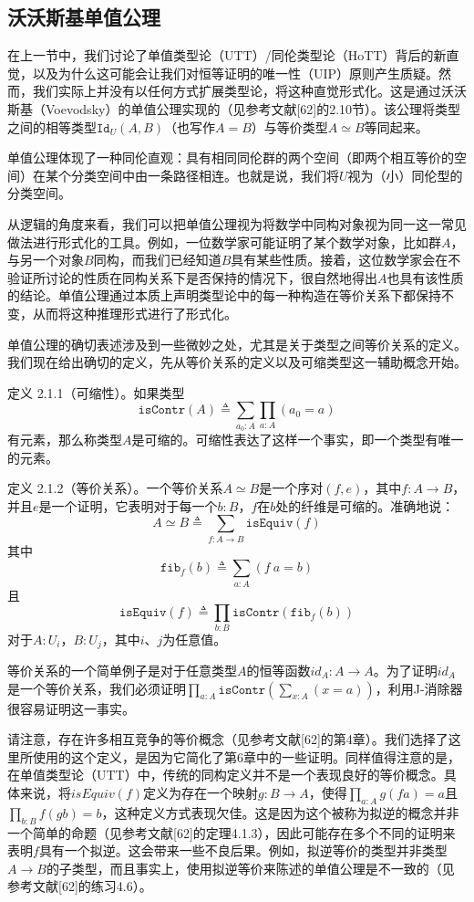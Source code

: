 \documentclass{ctexrep}
\theoremstyle{plain}
\theoremstyle{definition}
\theoremstyle{remark}
\newcommand{\fib}{\mathtt{fib}}
\begin{document}
\subsection{沃沃斯基单值公理}
在上一节中，我们讨论了单值类型论（UTT）/同伦类型论（HoTT）背后的新直觉，以及为什么这可能会让我们对恒等证明的唯一性（UIP）原则产生质疑。然而，我们实际上并没有以任何方式扩展类型论，将这种直觉形式化。这是通过沃沃斯基（Voevodsky）的单值公理实现的（见参考文献[62]的2.10节）。该公理将类型之间的相等类型\(\mathtt{Id}_{U}(A, B)\)（也写作\(A = B\)）与等价类型\(A \simeq B\)等同起来。

单值公理体现了一种同伦直观：具有相同同伦群的两个空间（即两个相互等价的空间）在某个分类空间中由一条路径相连。也就是说，我们将\(U\)视为（小）同伦型的分类空间。

从逻辑的角度来看，我们可以把单值公理视为将数学中同构对象视为同一这一常见做法进行形式化的工具。例如，一位数学家可能证明了某个数学对象，比如群\(A\)，与另一个对象\(B\)同构，而我们已经知道\(B\)具有某些性质。接着，这位数学家会在不验证所讨论的性质在同构关系下是否保持的情况下，很自然地得出\(A\)也具有该性质的结论。单值公理通过本质上声明类型论中的每一种构造在等价关系下都保持不变，从而将这种推理形式进行了形式化。 

单值公理的确切表述涉及到一些微妙之处，尤其是关于类型之间等价关系的定义。我们现在给出确切的定义，先从等价关系的定义以及可缩类型这一辅助概念开始。 

定义 2.1.1（可缩性）。如果类型
\[\mathtt{isContr} (A) \triangleq \sum_{a_{0}: A} \prod_{a: A}\left(a_{0}=a\right)\]
有元素，那么称类型\(A\)是可缩的。可缩性表达了这样一个事实，即一个类型有唯一的元素。 

定义 2.1.2（等价关系）。一个等价关系\(A \simeq B\)是一个序对\((f, e)\)，其中\(f: A \to B\)，并且\(e\)是一个证明，它表明对于每一个\(b: B\)，\(f\)在\(b\)处的纤维是可缩的。准确地说：
\[A \simeq B \triangleq \sum_{f: A \to B} \mathtt{isEquiv}(f)\]
其中
\[\fib_{f}(b) \triangleq \sum_{a: A}(f\ a = b)\] 且 \[\mathtt{isEquiv}(f) \triangleq \prod_{b: B} \mathtt{isContr}\left(\fib_{f}(b)\right)\]
对于\(A: U_{i}\)，\(B: U_{j}\)，其中\(i\)、\(j\)为任意值。 

等价关系的一个简单例子是对于任意类型\(A\)的恒等函数\(id_{A}: A \to A\)。为了证明\(id_{A}\)是一个等价关系，我们必须证明\(\prod_{a: A} \mathtt{isContr} (\sum_{x: A}(x = a))\)，利用J-消除器很容易证明这一事实。 

请注意，存在许多相互竞争的等价概念（见参考文献[62]的第4章）。我们选择了这里所使用的这个定义，是因为它简化了第6章中的一些证明。同样值得注意的是，在单值类型论（UTT）中，传统的同构定义并不是一个表现良好的等价概念。具体来说，将\(isEquiv(f)\)定义为存在一个映射\(g: B \to A\)，使得\(\prod_{a: A} g(f a)=a\)且\(\prod_{b: B} f(g b)=b\)，这种定义方式表现欠佳。这是因为这个被称为拟逆的概念并非一个简单的命题（见参考文献[62]的定理4.1.3），因此可能存在多个不同的证明来表明\(f\)具有一个拟逆。这会带来一些不良后果。例如，拟逆等价的类型并非类型\(A \to B\)的子类型，而且事实上，使用拟逆等价来陈述的单值公理是不一致的（见参考文献[62]的练习4.6）。 
\end{document}
